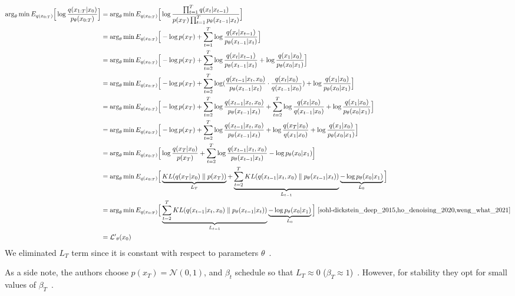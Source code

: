 \documentclass{article}
\numberwithin{equation}{subsection}
\begin{document}
\begin{align}
\arg_\theta \min E_{q(x_{0:T})}\Big[\log\frac{q(x_{1:T}|x_0)}{p_\theta(x_{0:T})}\Big] &= \arg_\theta \min E_{q(x_{0:T})}\Big[ \log\frac{\prod_{t=1}^T q(x_t|x_{t-1})}{ p(x_T) \prod_{t=1}^T p_\theta(x_{t-1} |x_t) }\Big] \\
&= \arg_\theta \min E_{q(x_{0:T})}\Big[ -\log p(x_T) + \sum_{t=1}^T \log \frac{q(x_t|x_{t-1})}{p_\theta(x_{t-1} |x_t)}\Big] \\
&= \arg_\theta \min E_{q(x_{0:T})}\Big[ -\log p(x_T) + \sum_{t=2}^T \log \frac{q(x_t|x_{t-1})}{p_\theta(x_{t-1} |x_t)} + \log\frac{q(x_1 |x_0)}{p_\theta(x_0 |x_1)}\Big]\\
&= \arg_\theta \min E_{q(x_{0:T})}\Big[ -\log p(x_T) + \sum_{t=2}^T \log ( \frac{q(x_{t-1} |x_t, x_0)}{p_\theta(x_{t-1} |x_t)}\cdot \frac{q(x_t |x_0)}{q(x_{t-1}|x_0)} ) + \log \frac{q(x_1 |x_0)}{p_\theta(x_0 |x_1)} \Big]\label{x0cond}\\
&= \arg_\theta \min E_{q(x_{0:T})}\Big[ -\log p(x_T) + \sum_{t=2}^T \log \frac{q(x_{t-1} |x_t, x_0)}{p_\theta(x_{t-1} |x_t)} + \sum_{t=2}^T \log \frac{q(x_t |x_0)}{q(x_{t-1} |x_0)} + \log\frac{q(x_1 |x_0)}{p_\theta(x_0 |x_1)}\Big] \\
&= \arg_\theta \min E_{q(x_{0:T})}\Big[-\log p(x_T) + \sum_{t=2}^T \log \frac{q(x_{t-1} |x_t, x_0)}{p_\theta(x_{t-1} |x_t)} + \log\frac{q(x_T |x_0)}{q(x_1 |x_0)} + \log \frac{q(x_1 |x_0)}{p_\theta(x_0 |x_1)}\Big]\\
&= \arg_\theta \min E_{q(x_{0:T})}\Big[\log\frac{q(x_T |x_0)}{p(x_T)} + \sum_{t=2}^T \log \frac{q(x_{t-1} |x_t, x_0)}{p_\theta(x_{t-1} |x_t)} - \log p_\theta(x_0 |x_1)\Big] \\
&= \arg_\theta \min E_{q(x_{0:T})}\Big[\underbrace{KL(q(x_T |x_0) \parallel p(x_T))}_{L_T} + \underbrace{\sum_{t=2}^T KL(q(x_{t-1} |x_t, x_0) \parallel p_\theta(x_{t-1} |x_t))}_{L_{t-1}} \underbrace{- \log p_\theta(x_0 |x_1)}_{L_0}\Big]\\
&= \arg_\theta \min E_{q(x_{0:T})}\Big[\underbrace{\sum_{t=2}^T KL(q(x_{t-1} |x_t, x_0) \parallel p_\theta(x_{t-1} |x_t))}_{L_{t-1}} \underbrace{- \log p_\theta(x_0 |x_1)}_{L_0}\Big]~\cite{sohl-dickstein_deep_2015,ho_denoising_2020,weng_what_2021}\\
&= \mathcal{L'}_\theta(x_0)
\end{align}
We eliminated $L_T$ term since it is constant with respect to parameters $\theta$~\cite{weng_what_2021}. 

As a side note, the authors choose $p(x_T)=\mathcal{N}(0,1)$, and $\beta_t$ schedule so that $L_T \approx 0$ ($\beta_T \approx 1$)~\cite{ho_denoising_2020}. However, for stability they opt for small values of $\beta_T$~\cite{sohl-dickstein_deep_2015, ho_denoising_2020}.
\end{document}
